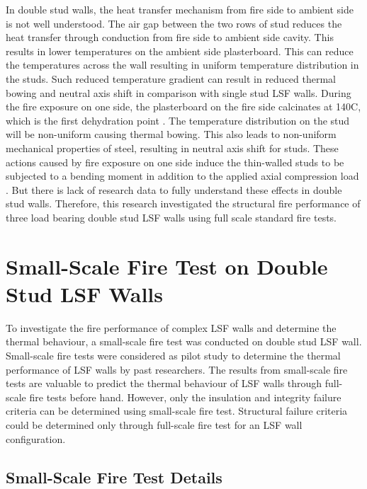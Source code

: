 In double stud walls, the heat transfer mechanism from fire side to ambient side is not well understood. The air gap between the two rows of stud reduces the heat transfer through conduction from fire side to ambient side cavity. This results in lower temperatures on the ambient side plasterboard. This can reduce the temperatures across the wall resulting in uniform temperature distribution in the studs. Such reduced temperature gradient can result in reduced thermal bowing and neutral axis shift in comparison with single stud LSF walls. During the fire exposure on one side, the plasterboard on the fire side calcinates at 140\degree C, which is the first dehydration point \citet{Keerthan2012a}. The temperature distribution on the stud will be non-uniform causing thermal bowing. This also leads to non-uniform mechanical properties of steel, resulting in neutral axis shift for studs. These actions caused by fire exposure on one side induce the thin-walled studs to be subjected to a bending moment in addition to the applied axial compression load \citet{Gunalan2013e}. But there is lack of research data to fully understand these effects in double stud walls. Therefore, this research investigated the structural fire performance of three load bearing double stud LSF walls using full scale standard fire tests.

\section{Small-Scale Fire Test on Double Stud LSF Walls}

To investigate the fire performance of complex LSF walls and determine the thermal behaviour, a small-scale fire test was conducted on double stud LSF wall. Small-scale fire tests were considered as pilot study to determine the thermal performance of LSF walls by past researchers. The results from small-scale fire tests are valuable to predict the thermal behaviour of LSF walls through full-scale fire tests before hand. However, only the insulation and integrity failure criteria can be determined using small-scale fire test. Structural failure criteria could be determined only through full-scale fire test for an LSF wall configuration.

\subsection{Small-Scale Fire Test Details}

